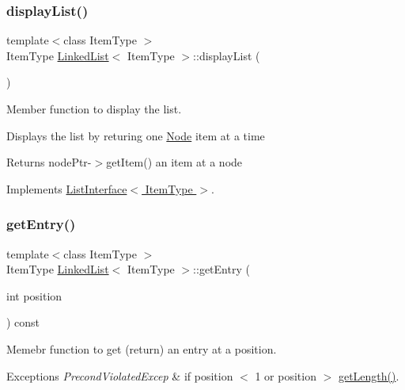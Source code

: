 \subsubsection{\texorpdfstring{display\+List()}{displayList()}}
{\footnotesize\ttfamily template$<$class Item\+Type $>$ \\
Item\+Type \hyperlink{classLinkedList}{Linked\+List}$<$ Item\+Type $>$\+::display\+List (\begin{DoxyParamCaption}{ }\end{DoxyParamCaption})\hspace{0.3cm}{\ttfamily [virtual]}}



Member function to display the list. 

Displays the list by returing one \hyperlink{classNode}{Node} item at a time \begin{DoxyReturn}{Returns}
node\+Ptr-\/$>$get\+Item() an item at a node 
\end{DoxyReturn}


Implements \hyperlink{classListInterface_a2f2f533e962dd89111ee50b972dc28e7}{List\+Interface$<$ Item\+Type $>$}.

\mbox{\label{classLinkedList_a341bfd7772c9d24d29eb7a7f3936915b}} 
\subsubsection{\texorpdfstring{get\+Entry()}{getEntry()}}
{\footnotesize\ttfamily template$<$class Item\+Type $>$ \\
Item\+Type \hyperlink{classLinkedList}{Linked\+List}$<$ Item\+Type $>$\+::get\+Entry (\begin{DoxyParamCaption}\item[{int}]{position }\end{DoxyParamCaption}) const\hspace{0.3cm}{\ttfamily [virtual]}}



Memebr function to get (return) an entry at a position. 


\begin{DoxyExceptions}{Exceptions}
{\em Precond\+Violated\+Excep} & if position $<$ 1 or position $>$ \hyperlink{classLinkedList_a61d045ef6008b494a1a516ecc992c0e7}{get\+Length()}.\\
\hline
\end{DoxyExceptions}

